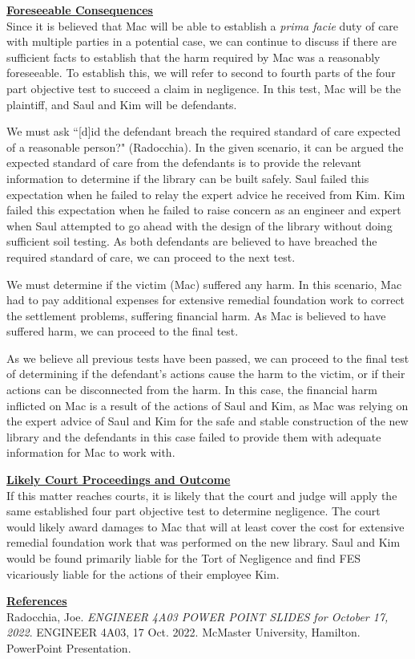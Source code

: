 \documentclass[12pt,letterpaper]{article}
\begin{document}
\par
\textbf{\underline{Foreseeable Consequences}}\\
\indent
Since it is believed that Mac will be able to establish a \textit{prima facie} duty of care with multiple parties in a potential case, we can continue to discuss if there are sufficient facts to establish that the harm required by Mac was a reasonably foreseeable. To establish this, we will refer to second to fourth parts of the four part objective test to succeed a claim in negligence. In this test, Mac will be the plaintiff, and Saul and Kim will be defendants.\par
We must ask ``[d]id the defendant breach the required standard of care expected of a reasonable person?" (Radocchia). In the given scenario, it can be argued the expected standard of care from the defendants is to provide the relevant information to determine if the library can be built safely. Saul failed this expectation when he failed to relay the expert advice he received from Kim. Kim failed this expectation when he failed to raise concern as an engineer and expert when Saul attempted to go ahead with the design of the library without doing sufficient soil testing. As both defendants are believed to have breached the required standard of care, we can proceed to the next test.\par
We must determine if the victim (Mac) suffered any harm. In this scenario, Mac had to pay additional expenses for extensive remedial foundation work to correct the settlement problems, suffering financial harm. As Mac is believed to have suffered harm, we can proceed to the final test.\par
As we believe all previous tests have been passed, we can proceed to the final test of determining if the defendant's actions cause the harm to the victim, or if their actions can be disconnected from the harm. In this case, the financial harm inflicted on Mac is a result of the actions of Saul and Kim, as Mac was relying on the expert advice of Saul and Kim for the safe and stable construction of the new library and the defendants in this case failed to provide them with adequate information for Mac to work with.

\par
\textbf{\underline{Likely Court Proceedings and Outcome}}\\
\indent
If this matter reaches courts, it is likely that the court and judge will apply the same established four part objective test to determine negligence. The court would likely award damages to Mac that will at least cover the cost for extensive remedial foundation work that was performed on the new library. Saul and Kim would be found primarily liable for the Tort of Negligence and find FES vicariously liable for the actions of their employee Kim. 

\clearpage 
\noindent
\textbf{\underline{References}}\\
Radocchia, Joe. \textit{ENGINEER 4A03 POWER POINT SLIDES for October 17, 2022}. ENGINEER 4A03, 17 Oct. 2022. McMaster University, Hamilton. PowerPoint Presentation. 
\end{document}
